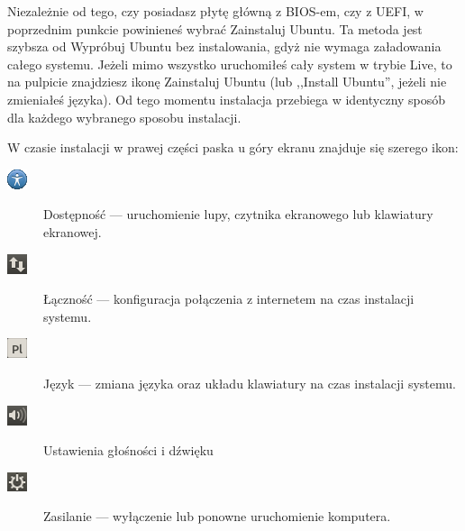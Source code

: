 Niezależnie od tego, czy posiadasz płytę główną z BIOS-em, czy z UEFI, w poprzednim punkcie powinieneś wybrać \textcolor{ubuntu_orange}{Zainstaluj Ubuntu}. Ta metoda jest szybsza od \textcolor{ubuntu_orange}{Wypróbuj Ubuntu bez instalowania}, gdyż nie wymaga załadowania całego systemu. Jeżeli mimo wszystko uruchomiłeś cały system w trybie Live, to na pulpicie znajdziesz ikonę \textcolor{ubuntu_orange}{Zainstaluj Ubuntu} (lub ,,Install Ubuntu'', jeżeli nie zmieniałeś języka). Od tego momentu instalacja przebiega w identyczny sposób dla każdego wybranego sposobu instalacji.

W czasie instalacji w prawej części paska u góry ekranu znajduje się szerego ikon:
\begin{description}
\item[\includegraphics{images/ikony_dostempnosc.png}]\textcolor{ubuntu_orange}{Dostępność} --- uruchomienie lupy, czytnika ekranowego lub klawiatury ekranowej.
\item[\includegraphics{images/ikony_internet.png}]\textcolor{ubuntu_orange}{Łączność} --- konfiguracja połączenia z internetem na czas instalacji systemu.
\item[\includegraphics{images/ikony_jezyk.png}]\textcolor{ubuntu_orange}{Język} --- zmiana języka oraz układu klawiatury na czas instalacji systemu.
\item[\includegraphics{images/ikony_dzwiek.png}]\textcolor{ubuntu_orange}{Ustawienia głośności i dźwięku}
\item[\includegraphics{images/ikony_zasilanie.png}]\textcolor{ubuntu_orange}{Zasilanie} --- wyłączenie lub ponowne uruchomienie komputera.
\end{description}
\clearpage
